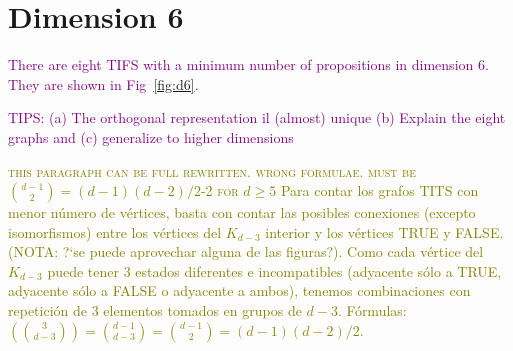 \documentclass[%
  twocolumn,
 showpacs,
 showkeys,
 preprintnumbers,
 amsmath,amssymb,
 aps,
  pra,
  longbibliography,
 floatfix,
 ]{revtex4-1}
\newcommand{\jr}[1]{\textcolor{purple}{#1}}
\newcommand{\meil}[1]{\textcolor{olive}{#1}}
\begin{document}
\section{Dimension 6}


\jr{There are eight TIFS with a minimum number of propositions in dimension $6$. They are shown in Fig~\ref{fig:d6}.}

\jr{TIPS: (a) The orthogonal representation il (almost) unique (b) Explain the eight graphs and (c) generalize to higher dimensions}

\meil{\textsc{this paragraph can be full rewritten. wrong formulae. must be  $\binom{d-1}{2}=(d-1)(d-2)/2$-2 for $d\geq 5$} Para contar los grafos TITS con menor n\'umero de v\'ertices, basta con contar las posibles conexiones (excepto isomorfismos) entre los v\'ertices del $K_{d-3}$ interior
    y los v\'ertices  TRUE y FALSE. (NOTA: ?`se puede aprovechar alguna de las figuras?). Como cada v\'ertice del $K_{d-3}$ puede tener
    $3$ estados diferentes e incompatibles (adyacente s\'olo a TRUE, adyacente s\'olo a FALSE o adyacente a ambos), tenemos
    combinaciones con repetici\'on de 3 elementos tomados en grupos de $d-3$. F\'ormulas:
    $ \left(\!\!{3\choose {d-3}}\!\!\right)= \binom{d-1}{d-3} = \binom{d-1}{2}=(d-1)(d-2)/2$.}
\end{document}
